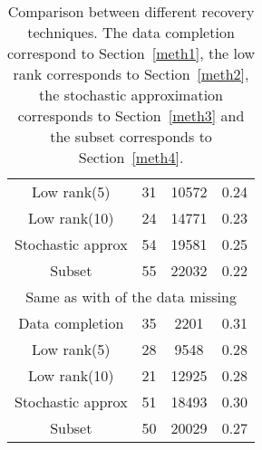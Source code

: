 \documentclass[12pt]{article}
\begin{document}
\begin{table}
\begin{center}
\begin{tabular}{|cccc|}
Low rank(5)            &        31            &              10572                   &        0.24       \\
Low rank(10)          &         24           &              14771                    &        0.23       \\
Stochastic approx  &       54             &             19581                    &      0.25         \\
Subset                     &       55            &              22032                    &       0.22        \\
\hline
\multicolumn{4}{|c|}{Same as  with  of the data missing} \\
\hline
Data completion    &       35                &             2201                        &     0.31          \\
Low rank(5)            &        28            &               9548                   &        0.28       \\
Low rank(10)          &         21           &              12925                    &        0.28       \\
Stochastic approx  &       51             &             18493                    &      0.30         \\
Subset                     &       50            &              20029                    &       0.27        \\
\hline
\end{tabular}
\caption{Comparison between different recovery techniques. The data completion
correspond to Section~\ref{meth1}, the low rank corresponds to Section~\ref{meth2}, the
stochastic approximation corresponds to Section~\ref{meth3} and the subset corresponds to Section~\ref{meth4}.}
 \label{tab1}
\end{center}
\end{table}
\end{document}
